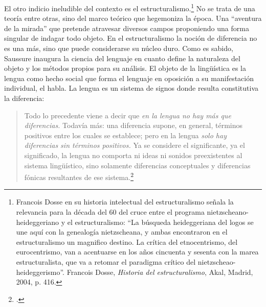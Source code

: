 \documentclass{book}
\begin{document}
El otro indicio ineludible del contexto es el
estructuralismo.\footnote{Francois Dosse en su historia intelectual del
  estructuralismo señala la relevancia para la década del 60 del cruce
  entre el programa nietzscheano-heideggeriano y el estructuralismo: \enquote{La
  búsqueda heideggeriana del logos se une aquí con la genealogía
  nietzscheana, y ambas encontraron en el estructuralismo un magnifico
  destino. La crítica del etnocentrismo, del eurocentrismo, van a
  acentuarse en los años cincuenta y sesenta con la marea
  estructuralista, que va a retomar el paradigma crítico del
  nietzscheao-heideggerismo}. Francois Dosse, \emph{Historia del
  estructuralismo}, Akal, Madrid, 2004, p. 416.} No se trata de una
teoría entre otras, sino del marco teórico que hegemoniza la época. Una
\enquote{aventura de la mirada} que pretende atravesar diversos campos
proponiendo una forma singular de indagar todo objeto. En el
estructuralismo la noción de diferencia no es una más, sino que puede
considerarse su núcleo duro. Como es sabido, Saussure inaugura la
ciencia del lenguaje en cuanto define la naturaleza del objeto y los
métodos propios para su análisis. El objeto de la lingüística es la
lengua como hecho social que forma el lenguaje en oposición a su
manifestación individual, el habla. La lengua es un sistema de signos
donde resulta constitutiva la diferencia:

\begin{quote}
Todo lo precedente viene a decir que \emph{en la lengua no hay más que
diferencias.} Todavía más: una diferencia supone, en general, términos
positivos entre los cuales se establece; pero en la lengua \emph{solo
hay diferencias sin términos positivos.} Ya se considere el
significante, ya el significado, la lengua no comporta ni ideas ni
sonidos preexistentes al sistema lingüístico, sino solamente diferencias
conceptuales y diferencias fónicas resultantes de ese
sistema.\footcite[144]{saussure1945}
\end{quote}
\end{document}

